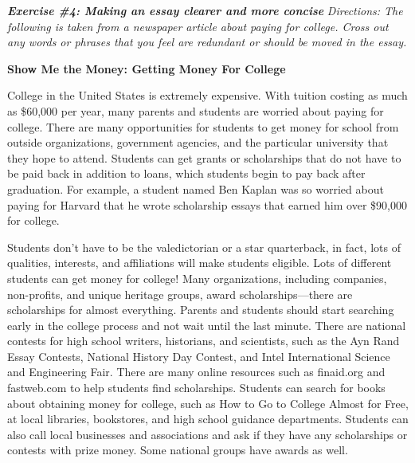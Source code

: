 \bigskip
\textbf{\textit{Exercise \#4: Making an essay clearer and more concise}}
\bigskip
\textit{Directions: The following is taken from a newspaper article about paying for college. Cross out any words or phrases that you feel are redundant or should be moved in the essay.}

\begin{spacing}{2}
\begin{center}
\textbf{Show Me the Money: Getting Money For College}
\end{center}

\begin{linenumbers*}
\modulolinenumbers[5]
\indent College in the United States is extremely expensive. With tuition costing as much as \$60,000 per year, many parents and students are worried about paying for college. There are many opportunities for students to get money for school from outside organizations, government agencies, and the particular university that they hope to attend. Students can get grants or scholarships that do not have to be paid back in addition to loans, which students begin to pay back after graduation. For example, a student named Ben Kaplan was so worried about paying for Harvard that he wrote scholarship essays that earned him over \$90,000 for college.

\indent Students don't have to be the valedictorian or a star quarterback, in fact, lots of qualities, interests, and affiliations will make students eligible. Lots of different students can get money for college! Many organizations, including companies, non-profits, and unique heritage groups, award scholarships—there are scholarships for almost everything. Parents and students should start searching early in the college process and not wait until the last minute. There are national contests for high school writers, historians, and scientists, such as the Ayn Rand Essay Contests, National History Day Contest, and Intel International Science and Engineering Fair. There are many online resources such as finaid.org and fastweb.com to help students find scholarships. Students can search for books about obtaining money for college, such as How to Go to College Almost for Free, at local libraries, bookstores, and high school guidance departments.  Students can also call local businesses and associations and ask if they have any scholarships or contests with prize money.  Some national groups have awards as well.


\end{linenumbers*}
\end{spacing}
